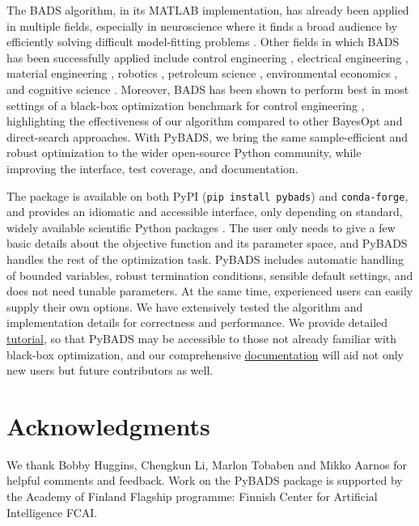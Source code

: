 \documentclass[
]{article}
\begin{document}
The BADS algorithm, in its MATLAB implementation, has already been applied in multiple fields, especially in neuroscience where it finds a broad audience by efficiently solving difficult model-fitting problems \parencite{cao2019causal, Tajima2019, Li2020, DAUBE20191924}. Other fields in which BADS has been successfully applied include control engineering \parencite{stenger2022benchmark}, electrical engineering \parencite{li2022topology}, material engineering \parencite{ren2021novel}, robotics \parencite{REN2020575}, petroleum science \parencite{FENG20222879}, environmental economics \parencite{Wildfires2020}, and cognitive science \parencite{STENGARD2022105160, vanOpheusden2023}. Moreover, BADS has been shown to perform best in most settings of a black-box optimization benchmark for control engineering \parencite{stenger2022benchmark}, highlighting the effectiveness of our algorithm compared to other BayesOpt and direct-search approaches.
With PyBADS, we bring the same sample-efficient and robust optimization to the wider open-source Python community, while improving the interface, test coverage, and documentation.

The package is available on both PyPI (\texttt{pip\ install\ pybads}) and \texttt{conda-forge}, and provides an idiomatic and accessible interface, only depending on standard, widely available scientific Python packages \cite{harris_array_2020}. The user only needs to give a few basic details about the objective function and its parameter space, and PyBADS handles the rest of the optimization task. PyBADS includes automatic handling of bounded variables, robust termination conditions, sensible default settings, and does not need tunable parameters. At the same time, experienced users can easily supply their own options. We have extensively tested the algorithm and implementation details for correctness and performance. We provide detailed \href{https://github.com/acerbilab/pybads/tree/main/examples}{tutorial}, so that PyBADS may be accessible to those not already familiar with black-box optimization, and our comprehensive \href{https://acerbilab.github.io/pybads}{documentation} will aid not only new users but future contributors as well.

\hypertarget{acknowledgments}{%
\section{Acknowledgments}\label{acknowledgments}}

We thank Bobby Huggins, Chengkun Li, Marlon Tobaben and Mikko Aarnos for helpful comments and feedback.
Work on the PyBADS package is supported by the Academy of Finland Flagship programme: Finnish Center for Artificial Intelligence FCAI.

\newrefcontext[sorting=nyt]
\printbibliography
\end{document}
